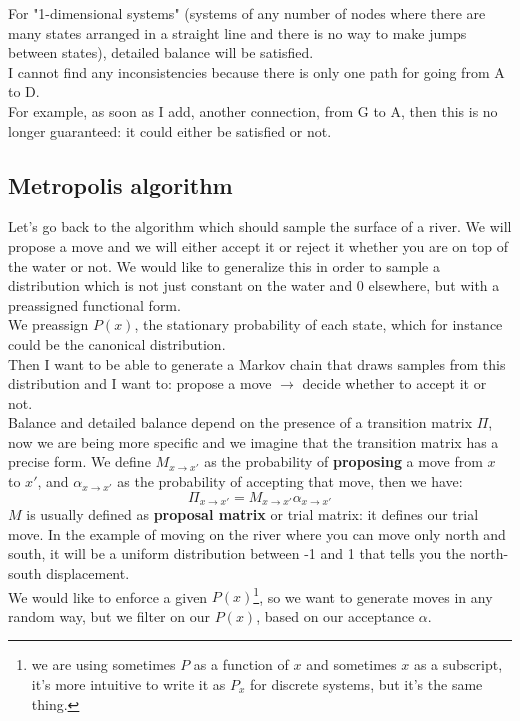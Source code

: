 For "1-dimensional systems" (systems of any number of nodes where there are many states arranged in a straight line and there is no way to make jumps between states), detailed balance will be satisfied.\\
I cannot find any inconsistencies because there is only one path for going from A to D.\\
For example, as soon as I add, another connection, from G to A, then this is no longer guaranteed: it could either be satisfied or not.
\subsection{Metropolis algorithm}\label{Metropolis}
Let's go back to the algorithm which should sample the surface of a river. We will propose a move and we will either accept it or reject it whether you are on top of the water or not.
We would like to generalize this in order to sample a distribution which is not just constant on the water and 0 elsewhere, but with a preassigned functional form.\\
We preassign $P(x)$, the stationary probability of each state, which for instance could be the canonical distribution.\\
Then I want to be able to generate a Markov chain that draws samples from this distribution and I want to: propose a move $\rightarrow$ decide whether to accept it or not.\\
Balance and detailed balance depend on the presence of a transition matrix $\Pi$, now we are being more specific and we imagine that the transition matrix has a precise form.
We define $M_{x\rightarrow x'}$ as the probability of \textbf{proposing} a move from $x$ to $x'$, and $\alpha_{x\rightarrow x'}$ as the probability of accepting that move, then we have:
\[
\Pi_{x\rightarrow x'} = M_{x\rightarrow x'}\alpha_{x\rightarrow x'}
\]
$M$ is usually defined as \textbf{proposal matrix} or trial matrix: it defines our trial move. In the example of moving on the river where you can move only north and south, it will be a uniform distribution between -1 and 1 that tells you the north-south displacement.\\
We would like to enforce a given $P(x)$\footnote{we are using sometimes $P$ as a function of $x$ and sometimes $x$ as a subscript, it's more intuitive to write it as $P_x$ for discrete systems, but it's the same thing.}, so we want to generate moves in any random way, but we filter on our $P(x)$, based on our acceptance $\alpha$.\\

